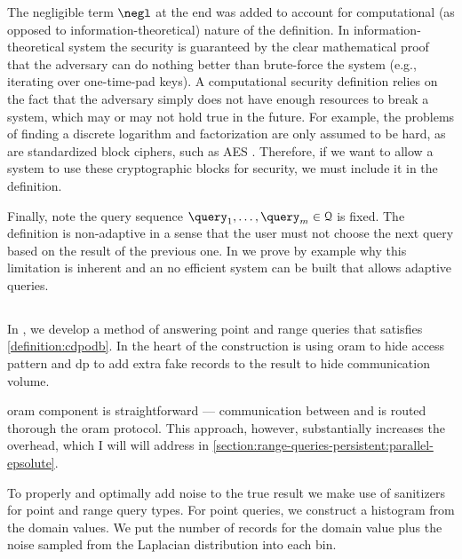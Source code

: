			The negligible term $\negl$ at the end was added to account for computational (as opposed to information-theoretical) nature of the definition.
			In information-theoretical system the security is guaranteed by the clear mathematical proof that the adversary can do nothing better than brute-force the system (e.g., iterating over one-time-pad keys).
			A computational security definition relies on the fact that the adversary simply does not have enough resources to break a system, which may or may not hold true in the future.
			For example, the problems of finding a discrete logarithm and factorization are only assumed to be hard, as are standardized block ciphers, such as AES \cite{aes-nist}.
			Therefore, if we want to allow a system to use these cryptographic blocks for security, we must include it in the definition.

			Finally, note the query sequence $\fromNtoM{\query}{1}{m} \in \querySet$ is fixed.
			The definition is non-adaptive in a sense that the user \user{} must not choose the next query based on the result of the previous one.
			In \cite[Section 3.1.1]{epsolute} we prove by example why this limitation is inherent and an no efficient system can be built that allows adaptive queries.

		\subsection{\epsolute{}}

			In \epsolute{} \cite{epsolute}, we develop a method of answering point and range queries that satisfies \cref{definition:cdpodb}.
			In the heart of the construction is using \acrshort{oram} to hide access pattern and \acrshort{dp} to add extra fake records to the result to hide communication volume.

			\acrshort{oram} component is straightforward --- communication between \user{} and \server{} is routed thorough the \acrshort{oram} protocol.
			This approach, however, substantially increases the overhead, which I will will address in \cref{section:range-queries-persistent:parallel-epsolute}.

			To properly and optimally add noise to the true result we make use of sanitizers for point and range query types.
			For point queries, we construct a histogram from the domain values.
			We put the number of records for the domain value plus the noise sampled from the Laplacian distribution into each bin.

			

